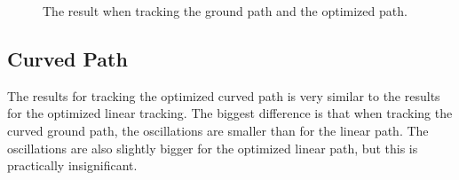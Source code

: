 \begin{figure}
	\caption{The result when tracking the ground path and the optimized path.}
	\label{fig:lin_sim_res}
\end{figure}



\subsection{Curved Path}

The results for tracking the optimized curved path is very similar to the results for the optimized linear tracking. The biggest difference is that when tracking the curved ground path, the oscillations are smaller than for the linear path. The oscillations are also slightly bigger for the optimized linear path, but this is practically insignificant.

